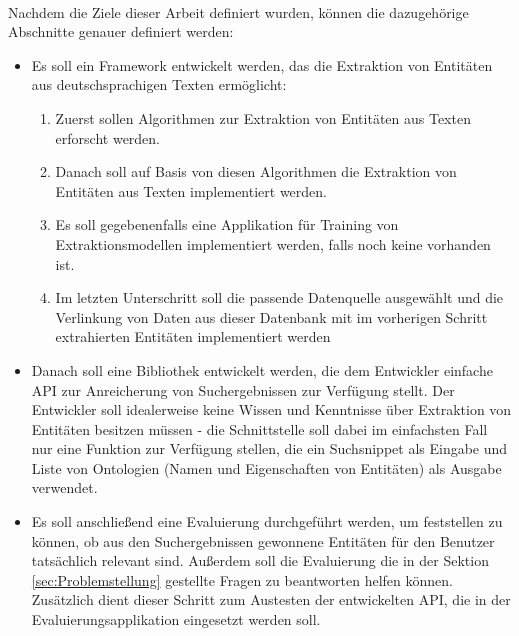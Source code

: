\paragraph{}
Nachdem die Ziele dieser Arbeit definiert wurden, können die dazugehörige Abschnitte genauer definiert werden: 
\begin{itemize}
\item Es soll ein Framework entwickelt werden, das die Extraktion von Entitäten aus deutschsprachigen Texten ermöglicht:
\begin{enumerate}
\item Zuerst sollen Algorithmen zur Extraktion von Entitäten aus Texten erforscht werden.
\item Danach soll auf Basis von diesen Algorithmen die Extraktion von Entitäten aus Texten implementiert werden.
\item Es soll gegebenenfalls eine Applikation für Training von Extraktionsmodellen implementiert werden, falls noch keine vorhanden ist.
\item Im letzten Unterschritt soll die passende Datenquelle ausgewählt und die Verlinkung von Daten aus dieser Datenbank mit im vorherigen Schritt extrahierten Entitäten implementiert werden 
\end{enumerate}

\item Danach soll eine Bibliothek entwickelt werden, die dem Entwickler einfache API zur Anreicherung von Suchergebnissen zur Verfügung stellt. Der Entwickler soll idealerweise keine Wissen und Kenntnisse über Extraktion von Entitäten besitzen müssen - die Schnittstelle soll dabei im einfachsten Fall nur eine Funktion zur Verfügung stellen, die ein Suchsnippet als Eingabe und Liste von Ontologien (Namen und Eigenschaften von Entitäten) als Ausgabe verwendet.

\item Es soll anschließend eine Evaluierung durchgeführt werden, um feststellen zu können, ob aus den Suchergebnissen gewonnene Entitäten für den Benutzer tatsächlich relevant sind. Außerdem soll die Evaluierung die in der Sektion \ref{sec:Problemstellung} gestellte Fragen zu beantworten helfen können. Zusätzlich dient dieser Schritt zum Austesten der entwickelten API, die in der Evaluierungsapplikation eingesetzt werden soll.
\end{itemize}